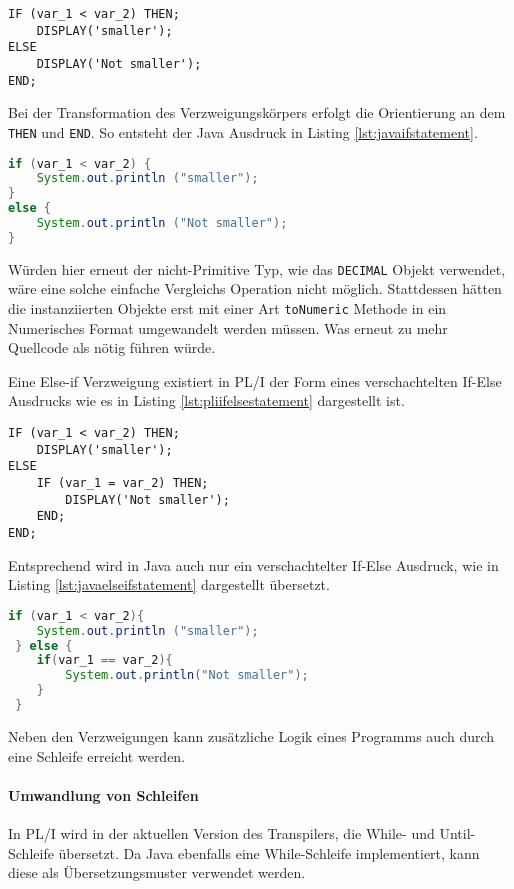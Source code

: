 \begin{lstlisting}[language=PL/I, caption=PL/I if-statements, label={lst:javacallsproc}]
IF (var_1 < var_2) THEN;
	DISPLAY('smaller');
ELSE
	DISPLAY('Not smaller');
END;
\end{lstlisting} 

Bei der Transformation des Verzweigungskörpers erfolgt die Orientierung an dem \verb+THEN+ und \verb+END+.
So entsteht der Java Ausdruck in Listing \ref{lst:javaifstatement}.

\begin{lstlisting}[language=Java, caption=Java if-statements, label={lst:javaifstatement}]
if (var_1 < var_2) {
	System.out.println ("smaller");
}
else {
	System.out.println ("Not smaller");
}
\end{lstlisting} 

Würden hier erneut der nicht-Primitive Typ, wie das \verb+DECIMAL+ Objekt verwendet, wäre eine solche einfache Vergleichs Operation nicht möglich.
Stattdessen hätten die instanziierten Objekte erst mit einer Art \verb+toNumeric+ Methode in ein Numerisches Format umgewandelt werden müssen.
Was erneut zu mehr Quellcode als nötig führen würde.

Eine Else-if Verzweigung existiert in PL/I der Form eines verschachtelten If-Else Ausdrucks wie es in Listing \ref{lst:pliifelsestatement} dargestellt ist.

\begin{lstlisting}[language=PL/I, caption=PL/I IF-ELSE Statement, label={lst:pliifelsestatement}]
IF (var_1 < var_2) THEN;
	DISPLAY('smaller');
ELSE
	IF (var_1 = var_2) THEN;
		DISPLAY('Not smaller');
	END;
END;
\end{lstlisting} 
 
 Entsprechend wird in Java auch nur ein verschachtelter If-Else Ausdruck, wie in Listing \ref{lst:javaelseifstatement} dargestellt übersetzt.
 
 \begin{lstlisting}[language=Java, caption=Java If-Else Statement, label={lst:javaelseifstatement}]
 if (var_1 < var_2){
 	System.out.println ("smaller");
 } else {
 	if(var_1 == var_2){
 		System.out.println("Not smaller");
 	}
 }
 \end{lstlisting} 

Neben den Verzweigungen kann zusätzliche Logik eines Programms auch durch eine Schleife erreicht werden.

\paragraph{Umwandlung von Schleifen}
In PL/I wird in der aktuellen Version des Transpilers, die  While- und Until-Schleife übersetzt.
Da Java ebenfalls eine While-Schleife implementiert, kann diese als Übersetzungsmuster verwendet werden.

